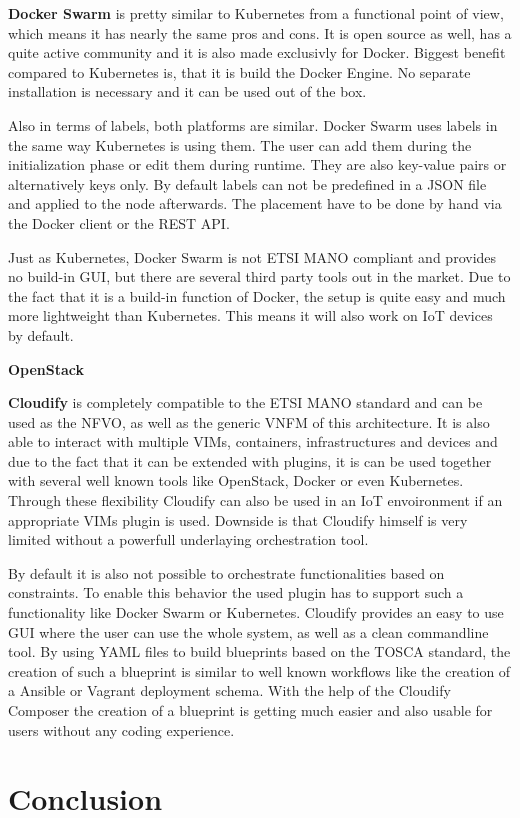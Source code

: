 \textbf{Docker Swarm} is pretty similar to Kubernetes from a functional point of view, which means it has nearly the same pros and cons.
It is open source as well, has a quite active community and it is also made exclusivly for Docker.
Biggest benefit compared to Kubernetes is, that it is build the Docker Engine.
No separate installation is necessary and it can be used out of the box.

Also in terms of labels, both platforms are similar.
Docker Swarm uses labels in the same way Kubernetes is using them.
The user can add them during the initialization phase or edit them during runtime.
They are also key-value pairs or alternatively keys only.
By default labels can not be predefined in a \ac{JSON} file and applied to the node afterwards.
The placement have to be done by hand via the Docker client or the \ac{REST} \ac{API}.

Just as Kubernetes, Docker Swarm is not \ac{ETSI} \ac{MANO} compliant and provides no build-in \ac{GUI}, but there are several third party tools out in the market.
Due to the fact that it is a build-in function of Docker, the setup is quite easy and much more lightweight than Kubernetes.
This means it will also work on \ac{IoT} devices by default.

\textbf{OpenStack}

\textbf{Cloudify} is completely compatible to the \ac{ETSI} \ac{MANO} standard and can be used as the \ac{NFVO}, as well as the generic \ac{VNFM} of this architecture.\cite[cf.]{Cloudify:MANO}
It is also able to interact with multiple \acp{VIM}, containers, infrastructures and devices and due to the fact that it can be extended with plugins, it is can be used together with several well known tools like OpenStack, Docker or even Kubernetes.\cite[cf.]{Cloudify:MANO}
Through these flexibility Cloudify can also be used in an \ac{IoT} envoironment if an appropriate \acp{VIM} plugin is used.
Downside is that Cloudify himself is very limited without a powerfull underlaying orchestration tool.

By default it is also not possible to orchestrate functionalities based on constraints.
To enable this behavior the used plugin has to support such a functionality like Docker Swarm or Kubernetes.
Cloudify provides an easy to use \ac{GUI} where the user can use the whole system, as well as a clean commandline tool.
By using \ac{YAML} files to build blueprints based on the \ac{TOSCA} standard, the creation of such a blueprint is similar to well known workflows like the creation of a Ansible or Vagrant deployment schema.
With the help of the Cloudify Composer the creation of a blueprint is getting much easier and also usable for users without any coding experience.



\section{Conclusion}
\doit
